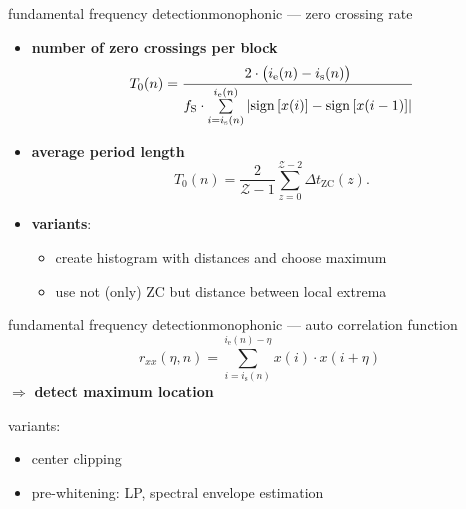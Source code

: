 	
	\begin{frame}{fundamental frequency detection}{monophonic --- zero crossing rate}
		\begin{itemize}
			\item	\textbf{number of zero crossings per block}
				\begin{equation*}
					T_0(n) = \frac{2\cdot \big(i_{\mathrm{e}}(n)-i_{\mathrm{s}}(n)\big)}{f_{\mathrm{S}}\cdot\sum\limits_{i=i_{\mathrm{s}}(n)}^{i_{\mathrm{e}}(n)}{\left|\operatorname*{sign} \left[x(i)\right]-\operatorname*{sign} \left[x(i-1)\right]\right|}} 
				\end{equation*}
			\pause
			\item	\textbf{average period length}
				\begin{equation*}
					T_0(n) = \frac{2}{\mathcal{Z}-1}\sum\limits_{z=0}^{\mathcal{Z}-2}{\Delta t_\mathrm{ZC}(z)}.
				\end{equation*}
			\pause
			\item	\textbf{variants}:
				\pause
				\begin{itemize}
					\item	create histogram with distances and choose maximum
					\pause
					\item	use not (only) ZC but distance between local extrema
				\end{itemize}
		\end{itemize}
	\end{frame}
	
	\begin{frame}{fundamental frequency detection}{monophonic --- auto correlation function}
		\begin{equation*}
			r_{xx}(\eta,n) = \sum\limits_{i=i_{\mathrm{s}}(n)}^{i_{\mathrm{e}}(n)-\eta}{x(i)\cdot x(i+\eta)}
		\end{equation*}
		\pause
		$\Rightarrow$ \textbf{detect maximum location}
		
		\pause
		variants:
		\begin{itemize}
			\item	center clipping
					\begin{figure}
					  	\centering
						
					  	\label{fig:centerclipping}
					\end{figure}
			\pause
			\item	pre-whitening: LP, spectral envelope estimation															
		\end{itemize}
	\end{frame}
	
